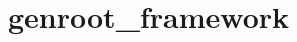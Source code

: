 \chapter{genroot\+\_\+framework}
\hypertarget{md_framework_2README}{}\label{md_framework_2README}
\label{md_framework_2README_autotoc_md0}%
%
